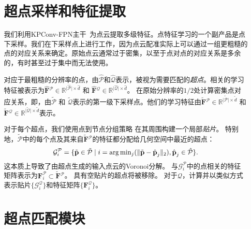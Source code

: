 \section{超点采样和特征提取}
\label{sec:model-backbone}
我们利用KPConv-FPN主干~\cite{thomas2019kpconv,lin2017feature}为点云提取多级特征。点特征学习的一个副产品是点下采样。我们在下采样点上进行工作，因为点云配准实际上可以通过一组更粗糙的点的对应关系来确定。原始点云通常过于密集，以至于点对点的对应关系是多余的，有时甚至过于集中而无法使用。

对应于最粗糙的分辨率的点，由$\hat{\mathcal{P}}$和$\hat{\mathcal{Q}}$表示，被视为需要匹配的\emph{超点}。相关的学习特征被表示为$\hat{\textbf{F}}{}^{\mathcal{P}} {\in} \mathbb{R}^{\lvert \hat{\mathcal{P}} \rvert \times \hat{d}}$ 和 $\hat{\textbf{F}}{}^{\mathcal{Q}} {\in} \mathbb{R}^{\lvert \hat{\mathcal{Q}} \rvert \times \hat{d}}$。
在原始分辨率的$1/2$处计算密集点对应关系，即，由$\tilde{\mathcal{P}}$ 和 $\tilde{\mathcal{Q}}$表示的第一级下采样点。他们的学习特征由$\tilde{\textbf{F}}{}^{\mathcal{P}} {\in} \mathbb{R}^{\lvert \tilde{\mathcal{P}} \rvert \times \tilde{d}}$ 和 $\tilde{\textbf{F}}{}^{\mathcal{Q}} {\in} \mathbb{R}^{\lvert \tilde{\mathcal{Q}} \rvert \times \tilde{d}}$表示。

对于每个超点，我们使用点到节点分组策略 \cite{li2018so,yu2021cofinet}在其周围构建一个局部\emph{贴片}。
特别地，$\tilde{\mathcal{P}}$中的每个点及其来自$\tilde{\textbf{F}}{}^{\mathcal{P}}$的特征都分配给几何空间中最近的超点：
\vspace{-2pt}
\begin{equation}
\mathcal{G}^{\mathcal{P}}_i = \{\tilde{\textbf{p}} \in \tilde{\mathcal{P}} \mid i = \arg\min\nolimits_j (\lVert \tilde{\textbf{p}} - \hat{\textbf{p}}_j \rVert_2), \hat{\textbf{p}}_j \in \hat{\mathcal{P}}\}.
\vspace{-2pt}
\end{equation}
这本质上导致了由超点生成的输入点云的Voronoi分解。
与$\mathcal{G}^{\mathcal{P}}_i$中的点相关的特征矩阵表示为$\textbf{F}^{\mathcal{P}}_i \subset \tilde{\textbf{F}}{}^{\mathcal{P}}$。
具有空贴片的超点将被移除。
对于$\mathcal{Q}$，计算并以类似方式表示贴片$\{\mathcal{G}^{\mathcal{Q}}_i\}$和特征矩阵$\{\textbf{F}^{\mathcal{Q}}_i\}$。

\section{超点匹配模块}
\label{sec:model-pam}

